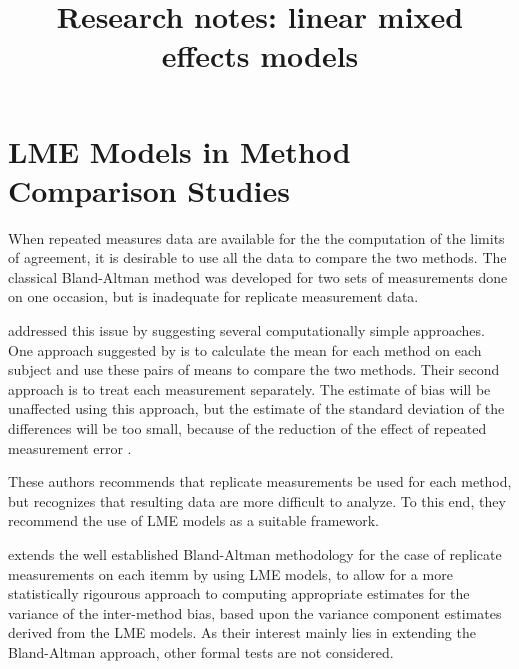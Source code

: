 \documentclass[12pt, a4paper]{report}
\title{Research notes: linear mixed effects models}
\author{ } \date{ }
\theoremstyle{plain}
\theoremstyle{definition}
\theoremstyle{remark}
\begin{document}
	\tableofcontents
	\newpage
	\section{LME Models in Method Comparison Studies}
	
	
	When repeated measures data are available for the the computation of the limits of agreement, it is desirable to use all the data to compare the two methods. The classical Bland-Altman method was developed for two sets of measurements done on one occasion, but is inadequate for replicate measurement data. 
	
	\citet{BA99} addressed this issue by suggesting several computationally simple approaches.  One approach suggested by \citet{BA99} is to calculate the mean for each method on each subject and use these pairs of means to compare the two methods. Their second approach is to treat each measurement separately. 
	The estimate of bias will be unaffected using this approach, but the estimate of the standard deviation of the differences will be too small, because of the reduction of the effect of repeated measurement error \citep{BXC2004,BXC2008}. 
	
	These authors recommends that replicate measurements be used for each method, but recognizes that resulting data are more difficult to analyze. To this end, they recommend the use of LME models as a suitable framework.
	
	
	
	
	
	\citet{BXC2008} extends the well established Bland-Altman methodology for the case of replicate measurements on each itemm by using LME models, to allow for a more statistically rigourous approach to computing appropriate estimates for the variance of the inter-method bias, based upon the variance component estimates derived from the LME models. As their interest mainly lies in extending the Bland-Altman approach, other formal tests are not considered.  
	
\end{document}
